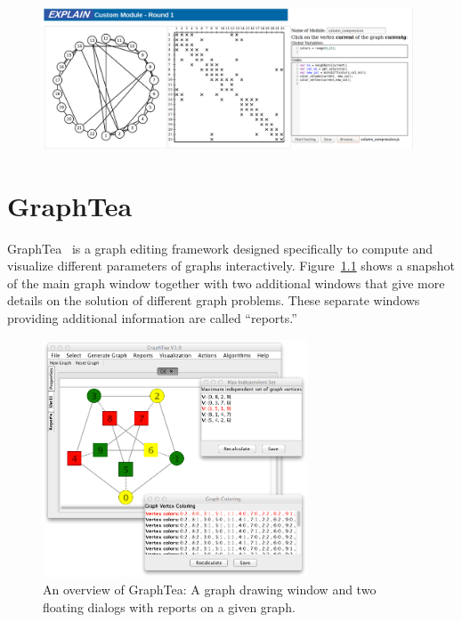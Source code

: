 \documentclass[12pt, oneside]{book}
\begin{document}
\begin{figure}
\centering
\includegraphics[width=0.98\textwidth]{custom}
\caption{}
\label{f.custom}
\end{figure}



\chapter{GraphTea}
GraphTea~\cite{2014:07,2014:15,2014:16} is a 
graph editing framework designed specifically to compute and visualize
different parameters of graphs interactively.
Figure~\ref{f.graphtea} shows a snapshot of the main
graph window together with two additional windows that give more details on the solution
of different graph problems. These separate windows providing additional information are
called ``reports.''

\begin{figure}
\centering
\includegraphics[width=0.7\textwidth]{graphtea}
\caption{An overview of GraphTea: A graph drawing window and 
two floating dialogs with reports on a given graph.}
\label{f.graphtea}
\end{figure}
\end{document}
